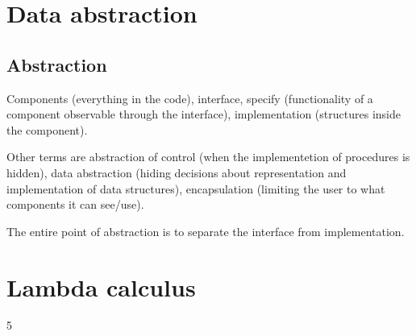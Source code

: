 \documentclass[12pt, a4paper]{article}
\begin{document}
\newpage
\section{Data abstraction}
\subsection{Abstraction}
Components (everything in the code), interface, specify (functionality of a component observable through the 
interface), implementation (structures inside the component).

Other terms are abstraction of control (when the implementetion of procedures is hidden), data abstraction (hiding
decisions about representation and implementation of data structures), encapsulation (limiting the user to what
components it can see/use).

The entire point of abstraction is to separate the interface from implementation.

\newpage
\section{Lambda calculus}5 
\end{document}

